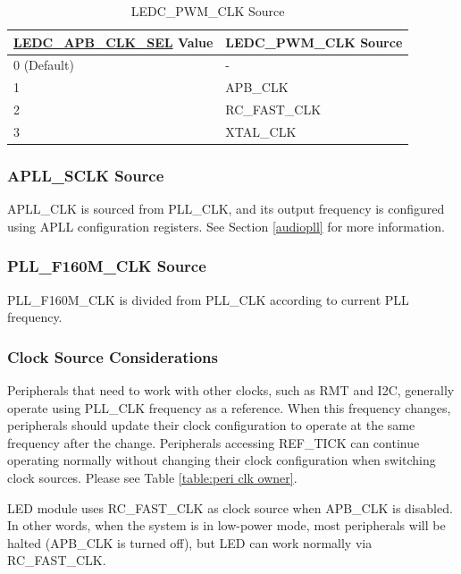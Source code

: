 \documentclass[main\_\_EN.tex]{subfiles}
\begin{document}
    \begin{longtable}[c]{ |p{7.5cm}|p{7.5cm}| } \caption{LEDC\_PWM\_CLK Source}
    \label{table:led_sclk} \\
        \hline
        \rowcolor{lightgray}
        \hyperref[fielddesc:LEDCAPBCLKSEL]{LEDC\_APB\_CLK\_SEL} Value & LEDC\_PWM\_CLK Source \\
        \hline
        0 (Default) & - \\
        \hline
        1 & APB\_CLK \\
        \hline
        2 & RC\_FAST\_CLK \\
        \hline
        3 & XTAL\_CLK \\
        \hline
\end{longtable}

\subsubsection{APLL\_SCLK Source}

APLL\_CLK is sourced from PLL\_CLK, and its output frequency is configured using APLL configuration registers. See Section \ref{audiopll} for more information.

\subsubsection{PLL\_F160M\_CLK Source}

PLL\_F160M\_CLK is divided from PLL\_CLK according to current PLL frequency.


\subsubsection{Clock Source Considerations}\label{ClockSourceConsiderations}

Peripherals that need to work with other clocks, such as RMT and I2C, generally operate using PLL\_CLK frequency as a reference. When this frequency changes, peripherals should update their clock configuration to operate at the same frequency after the change. Peripherals accessing REF\_TICK can continue operating normally without changing their clock configuration when switching clock sources. Please see Table \ref{table:peri clk owner}.

LED module uses RC\_FAST\_CLK as clock source when APB\_CLK is disabled. In other words, when the system is in low-power mode, 
most peripherals will be halted (APB\_CLK is turned off), but LED can work normally via RC\_FAST\_CLK.
\end{document}
